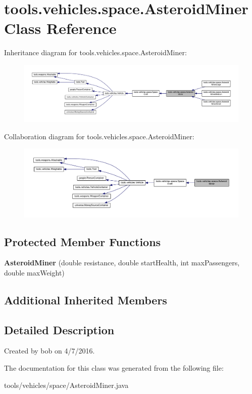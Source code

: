 \hypertarget{classtools_1_1vehicles_1_1space_1_1_asteroid_miner}{}\section{tools.\+vehicles.\+space.\+Asteroid\+Miner Class Reference}
\label{classtools_1_1vehicles_1_1space_1_1_asteroid_miner}


Inheritance diagram for tools.\+vehicles.\+space.\+Asteroid\+Miner\+:
\nopagebreak
\begin{figure}[H]
\begin{center}
\leavevmode
\includegraphics[width=350pt]{classtools_1_1vehicles_1_1space_1_1_asteroid_miner__inherit__graph}
\end{center}
\end{figure}


Collaboration diagram for tools.\+vehicles.\+space.\+Asteroid\+Miner\+:
\nopagebreak
\begin{figure}[H]
\begin{center}
\leavevmode
\includegraphics[width=350pt]{classtools_1_1vehicles_1_1space_1_1_asteroid_miner__coll__graph}
\end{center}
\end{figure}
\subsection*{Protected Member Functions}
\begin{DoxyCompactItemize}
\item 
{\bfseries Asteroid\+Miner} (double resistance, double start\+Health, int max\+Passengers, double max\+Weight)\hypertarget{classtools_1_1vehicles_1_1space_1_1_asteroid_miner_afa22c9552af5cec504d8552fee6fa681}{}\label{classtools_1_1vehicles_1_1space_1_1_asteroid_miner_afa22c9552af5cec504d8552fee6fa681}

\end{DoxyCompactItemize}
\subsection*{Additional Inherited Members}


\subsection{Detailed Description}
Created by bob on 4/7/2016. 

The documentation for this class was generated from the following file\+:\begin{DoxyCompactItemize}
\item 
tools/vehicles/space/Asteroid\+Miner.\+java\end{DoxyCompactItemize}

